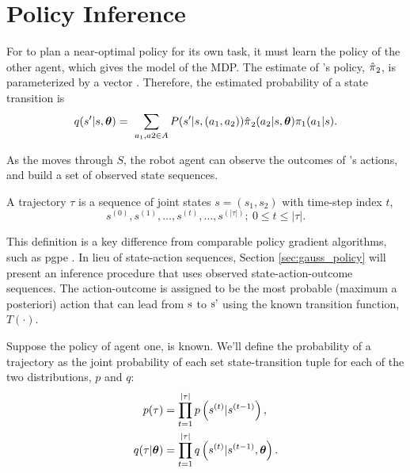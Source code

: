 \section{Policy Inference}\label{sec:policy_obj}

    For  to plan a near-optimal policy for its own task, it must learn the policy of the other agent, which
    gives the model of the MDP. The estimate of 's policy, $\hat{\pi_{}}_2$, is parameterized by a
    vector \vect{\theta}.  Therefore, the estimated probability of a state transition is
    \begin{equation}\label{eq:est_state_trans_prob}
        q(s'|s, \boldsymbol{\mathbb{\theta}}) = \
            \sum_{a_1, a2 \in A}P(s'|s,(a_1,a_2))\hat{\pi_{}}_2(a_2|s,\boldsymbol{\mathbb{\theta}})\pi_{1}(a_1|s).
    \end{equation}

    As the  moves through $S$, the robot agent can observe the outcomes of 's actions, and build a set
    of observed state sequences.
    \begin{definition}\label{def:traj}
        A trajectory $\tau$ is a sequence of joint states $s=(s_1, s_2)$ with time-step index $t$,
        \[
        s^{(0)}, s^{(1)}, \ldots , s^{(t)}, \ldots , s^{(|\tau|)};\ 0 \leq t \leq |\tau|.
        \]
    \end{definition}

    \begin{remark}
        This definition is a key difference from comparable policy gradient algorithms, such as \ac{pgpe}
        \cite{tangkaratt2014model} \cite{sehnke2010parameter}. In lieu of state-action sequences, Section
        \ref{sec:gauss_policy} will present an inference procedure that uses observed state-\textnormal{action-outcome}
        sequences. The action-outcome is assigned to be the most probable \textnormal{(maximum a posteriori)} action
        that can lead from $\textnormal{s}$ to $\textnormal{s'}$ using the known transition function, $T(\cdot)$.
    \end{remark}

    Suppose the policy of agent one,  is known. We'll define the probability of a trajectory as the joint
    probability of each set state-transition tuple for each of the two distributions, $p$ and $q$:
    \begin{align*}
        p(\tau) &= \prod_{t=1}^{|\tau|}p\left( s^{(t)}| s^{(t-1)} \right), \\
        q(\tau|\boldsymbol{\mathbb{\theta}}) &= \prod_{t=1}^{|\tau|}q\left(s^{(t)}| s^{(t-1)}, \boldsymbol{\mathbb{\theta}}\right).
    \end{align*}

